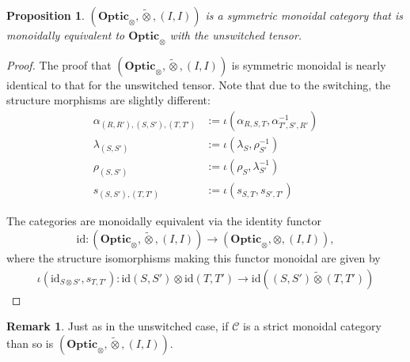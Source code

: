 \documentclass[11pt,letterpaper]{article}
\theoremstyle{plain}
\newtheorem{proposition}[theorem]{Proposition}
\theoremstyle{definition}
\newtheorem{remark}[theorem]{Remark}
\newcommand{\C}{\mathscr{C}}
\newcommand{\Optic}{\mathbf{Optic}}
\newcommand{\switched}{\mathbin{\tilde{\otimes}}}
\newcommand{\id}{\mathrm{id}}
\begin{document}
\begin{proposition}
  $(\Optic_\otimes, \switched, (I, I))$ is a symmetric monoidal category that is monoidally equivalent to $\Optic_\otimes$ with the unswitched tensor.
\end{proposition}
\begin{proof}
  The proof that $(\Optic_\otimes, \switched, (I, I))$ is symmetric monoidal is nearly identical to that for the unswitched tensor. Note that due to the switching, the structure morphisms are slightly different:
  \begin{align*}
    \alpha_{(R, R'), (S, S'), (T, T')} &:= \iota(\alpha_{R,S,T}, \alpha_{T',S',R'}^{-1}) \\
    \lambda_{(S, S')} &:= \iota(\lambda_{S}, \rho_{S'}^{-1}) \\
    \rho_{(S, S')} &:= \iota(\rho_{S}, \lambda_{S'}^{-1}) \\
    s_{(S, S'), (T, T')} &:= \iota(s_{S, T}, s_{S', T'})
  \end{align*}

  The categories are monoidally equivalent via the identity functor \[\id : (\Optic_\otimes, \switched, (I, I)) \to (\Optic_\otimes, \otimes, (I, I)),\] where the structure isomorphisms making this functor monoidal are given by
  \begin{align*}
    \iota(\id_{S \otimes S'}, s_{T, T'}) : \id(S, S') \otimes \id(T, T') \to \id((S, S') \switched (T, T'))
  \end{align*}
\end{proof}

\begin{remark}
  Just as in the unswitched case, if $\C$ is a strict monoidal category than so is $(\Optic_\otimes, \switched, (I, I))$.
\end{remark}
\end{document}
